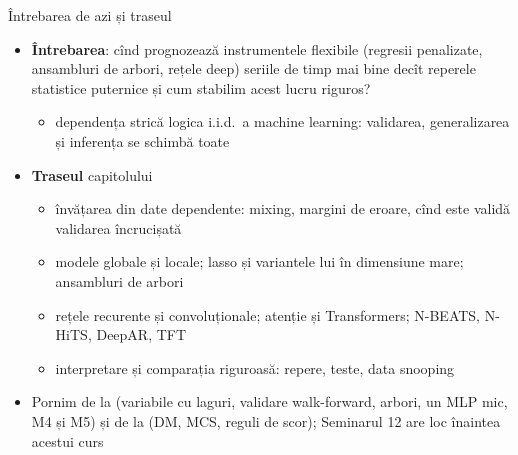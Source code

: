 \begin{frame}{Întrebarea de azi și traseul}
\itemsize{\small}
\begin{itemize}
    \item \textbf{Întrebarea}: cînd prognozează instrumentele flexibile (regresii penalizate, ansambluri de arbori, rețele deep) seriile de timp mai bine decît reperele statistice puternice și cum stabilim acest lucru riguros?
    \begin{itemize}
        \item dependența strică logica i.i.d.\ a machine learning: validarea, generalizarea și inferența se schimbă toate
    \end{itemize}
    \item \textbf{Traseul} capitolului
    \begin{itemize}
        \item învățarea din date dependente: mixing, margini de eroare, cînd este validă validarea încrucișată
        \item modele globale și locale; lasso și variantele lui în dimensiune mare; ansambluri de arbori
        \item rețele recurente și convoluționale; atenție și Transformers; N-BEATS, N-HiTS, DeepAR, TFT
        \item interpretare și comparația riguroasă: repere, teste, data snooping
    \end{itemize}
    \item Pornim de la  (variabile cu laguri, validare walk-forward, arbori, un MLP mic, M4 și M5) și de la  (DM, MCS, reguli de scor); Seminarul 12 are loc înaintea acestui curs
\end{itemize}
\end{frame}

